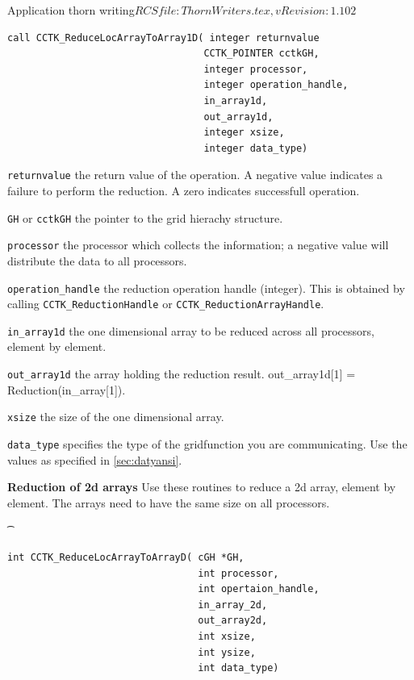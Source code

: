 \begin{cactuspart}{2}{Application thorn writing}{$RCSfile: ThornWriters.tex,v $}{$Revision: 1.102 $}
{\begin{verbatim}
call CCTK_ReduceLocArrayToArray1D( integer returnvalue
                                  CCTK_POINTER cctkGH,
                                  integer processor,
                                  integer operation_handle,
                                  in_array1d,
                                  out_array1d,
                                  integer xsize,
                                  integer data_type)
\end{verbatim}
}

\begin{Lentry}
\item[{\tt returnvalue}] the return value of the operation.  A
negative value indicates a failure to perform the reduction.  A zero
indicates successfull operation.
\item[{\tt GH} or {\tt cctkGH}] the pointer to the grid hierachy
structure.
\item[{\tt processor}] the processor which collects the
information; a negative value will distribute the data to all
processors.
\item[{\tt operation\_handle}] the reduction operation handle
(integer).  This is obtained by calling {\tt CCTK\_ReductionHandle} or
{\tt CCTK\_ReductionArrayHandle}.

\item[{\tt in\_array1d}] the one dimensional array to be reduced
across all processors, element by element.
\item[{\tt out\_array1d}] the array holding the reduction result. out\_array1d[1]
= Reduction(in\_array[1]).
\item[{\tt xsize}] the size of the one dimensional array.

\item[{\tt data\_type}] specifies the type of the gridfunction you are
communicating. Use the values as specified in \ref{sec:datyansi}.
\end{Lentry}

\vskip 0.24cm
{\bf Reduction of 2d arrays} Use these routines to reduce a 2d array, element by element. The arrays need to have the same size on all
processors.
{\t
\begin{verbatim}
int CCTK_ReduceLocArrayToArrayD( cGH *GH,
                                 int processor,
                                 int opertaion_handle,
                                 in_array_2d,
                                 out_array2d,
                                 int xsize,
                                 int ysize,
                                 int data_type)



\end{verbatim}}
\end{cactuspart}
